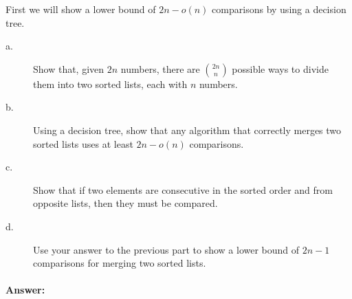 \documentclass[a4paper,10pt]{article}
\newcommand{\answer}{\paragraph{Answer:}}
\begin{document}
First we will show a lower bound of $2n-o(n)$ comparisons by using a decision tree.

\begin{description}
\item[a. \hspace{9pt}] Show that, given $2n$ numbers, there are ${2n}\choose{n}$ possible ways to divide them into
two sorted lists, each with $n$ numbers.

\item[b. \hspace{9pt}] Using a decision tree, show that any algorithm that correctly merges two sorted lists uses at
least $2n-o(n)$ comparisons.

\item[c. \hspace{9pt}]  Show that if two elements are consecutive in the sorted order and from opposite lists,
then they must be compared.

\item[d. \hspace{9pt}] Use your answer to the previous part to show a lower bound of $2n-1$ comparisons for merging
two sorted lists.

\end{description}

\answer
\end{document}
